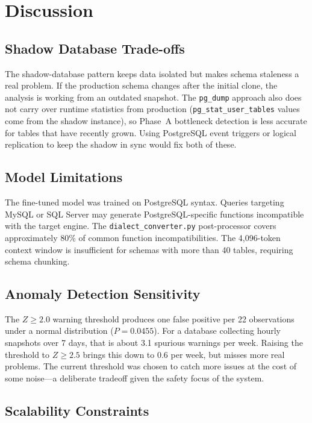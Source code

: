 \documentclass[12pt,a4paper]{report}
\begin{document}
\section{Discussion}

\subsection{Shadow Database Trade-offs}

The shadow-database pattern keeps data isolated but makes schema staleness a real problem. If the production schema changes after the initial clone, the analysis is working from an outdated snapshot. The \texttt{pg\_dump} approach also does not carry over runtime statistics from production (\texttt{pg\_stat\_user\_tables} values come from the shadow instance), so Phase~A bottleneck detection is less accurate for tables that have recently grown. Using PostgreSQL event triggers or logical replication to keep the shadow in sync would fix both of these.

\subsection{Model Limitations}

The fine-tuned model was trained on PostgreSQL syntax. Queries targeting MySQL or SQL Server may generate PostgreSQL-specific functions incompatible with the target engine. The \texttt{dialect\_converter.py} post-processor covers approximately 80\% of common function incompatibilities. The 4,096-token context window is insufficient for schemas with more than 40 tables, requiring schema chunking.

\subsection{Anomaly Detection Sensitivity}

The $Z \geq 2.0$ warning threshold produces one false positive per 22 observations under a normal distribution ($P = 0.0455$). For a database collecting hourly snapshots over 7 days, that is about 3.1 spurious warnings per week. Raising the threshold to $Z \geq 2.5$ brings this down to 0.6 per week, but misses more real problems. The current threshold was chosen to catch more issues at the cost of some noise---a deliberate tradeoff given the safety focus of the system.

\subsection{Scalability Constraints}
\end{document}

